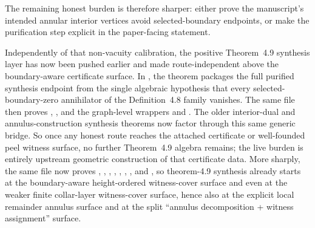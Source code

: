 \documentclass[11pt]{article}
\begin{document}
The remaining honest burden is therefore sharper: either prove the manuscript's
intended annular interior vertices avoid selected-boundary endpoints, or make
the purification step explicit in the paper-facing statement.

Independently of that non-vacuity calibration, the positive Theorem~4.9
synthesis layer has now been pushed earlier and made route-independent above
the boundary-aware certificate surface.  In
, the theorem
packages the full purified synthesis endpoint from the single algebraic
hypothesis that every selected-boundary-zero annihilator of the Definition~4.8
family vanishes.  The same file then proves
,
,
and the graph-level wrappers
and
.
The older interior-dual and annulus-construction synthesis theorems now factor
through this same generic bridge.  So once any honest route reaches the
attached certificate or well-founded peel witness surface, no further
Theorem~4.9 algebra remains; the live burden is entirely upstream geometric
construction of that certificate data.  More sharply, the same file now proves
,
,
,
,
,
,
,
and
,
so theorem-4.9 synthesis already starts at the boundary-aware height-ordered
witness-cover surface and even at the weaker finite collar-layer witness-cover
surface, hence also at the explicit local remainder annulus surface and at the
split ``annulus decomposition + witness assignment'' surface.
\end{document}
